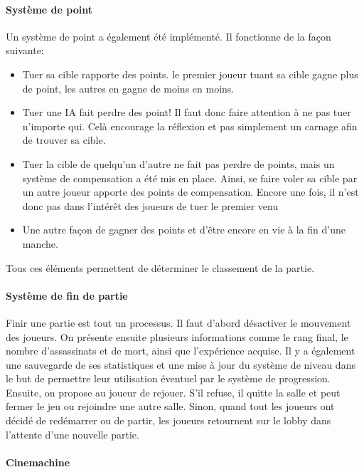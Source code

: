 		\paragraph{Système de point}

			Un système de point a également été implémenté. Il fonctionne de la façon suivante:
			\begin{itemize}
				\item Tuer sa cible rapporte des points. le premier joueur tuant sa cible gagne plus de point, les autres en gagne de moins en moins.
				\item Tuer une IA fait perdre des point! Il faut donc faire attention à ne pas tuer n'importe qui. Celà encourage la réflexion et pas simplement un carnage afin de trouver sa cible.
				\item Tuer la cible de quelqu'un d'autre ne fait pas perdre de points, mais un système de compensation a été mis en place. Ainsi, se faire voler sa cible par un autre joueur apporte des points de compensation. Encore une fois, il n'est donc pas dans l'intérêt 
				des joueurs de tuer le premier venu
				\item Une autre façon de gagner des points et d'être encore en vie à la fin d'une manche.
			\end{itemize}
			Tous ces éléments permettent de déterminer le classement de la partie.
	

		\paragraph{Système de fin de partie}

			Finir une partie est tout un processus. Il faut d'abord désactiver le mouvement des joueurs.
			On présente ensuite plusieurs informations comme le rang final, le nombre d'assassinats
			et de mort, ainsi que l'expérience acquise. Il y a également une sauvegarde de ses statistiques et une mise à jour du système
			de niveau dans le but de permettre leur utilisation éventuel par le système de progression.
			Ensuite, on propose au joueur de rejouer. S'il refuse, il quitte la salle et peut fermer le jeu ou rejoindre une autre salle.
			Sinon, quand tout les joueurs ont décidé de redémarrer ou de partir, les joueurs retournent 
			sur le lobby dans l'attente d'une nouvelle partie.


		\paragraph{Cinemachine}

